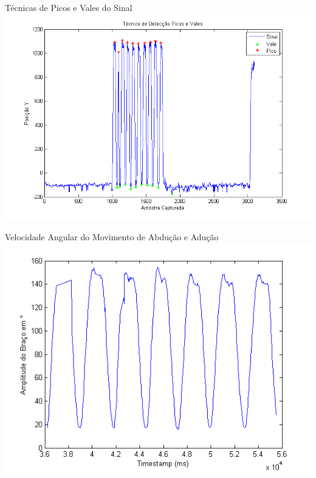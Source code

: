 \documentclass{beamer}
\begin{document}
\begin{frame}{Técnicas de Picos e Vales do Sinal}
      \center 
      \includegraphics[height=2.8 in]{img/deteccaopicosvales.png}
\end{frame}



\begin{frame}{Velocidade Angular do Movimento de Abdução e Adução}
      \center 
      \includegraphics[height=2.8 in]{img/amplitude-braco.png}
\end{frame}
\end{document}
